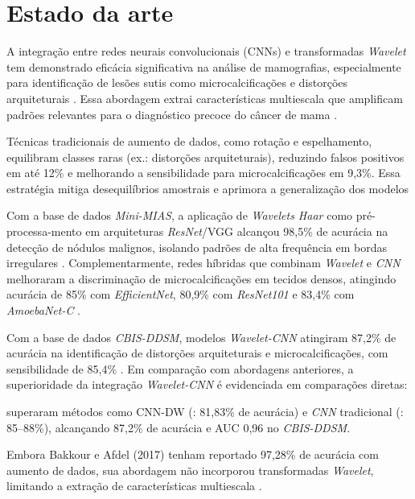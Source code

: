 \chapter{Estado da arte}\label{cap:revisao}

A integração entre redes neurais convolucionais (CNNs) e transformadas \textit{Wavelet} tem demonstrado eficácia significativa na análise de mamografias, especialmente para identificação de lesões sutis como microcalcificações e distorções arquiteturais \cite{blahova2025neural,oyelade2022novel}. Essa abordagem extrai características multiescala que amplificam padrões relevantes para o diagnóstico precoce do câncer de mama \cite{oyelade2022novel}.

Técnicas tradicionais de aumento de dados, como rotação e espelhamento, equilibram classes raras (ex.: distorções arquiteturais), reduzindo falsos positivos em até 12\% e melhorando a sensibilidade para microcalcificações em 9,3\%. Essa estratégia mitiga desequilíbrios amostrais e aprimora a generalização dos modelos \cite{blahova2025neural}

Com a base de dados \textit{Mini-MIAS}, a aplicação de \textit{Wavelets Haar} como pré-processa-mento em arquiteturas \textit{ResNet}/VGG alcançou 98,5\% de acurácia na detecção de nódulos malignos, isolando padrões de alta frequência em bordas irregulares \cite{rasheed2021use}. Complementarmente, redes híbridas que combinam \textit{Wavelet} e \textit{CNN} melhoraram a discriminação de microcalcificações em tecidos densos, atingindo acurácia de 85\% com \textit{EfficientNet}, 80,9\% com \textit{ResNet101} e 83,4\% com \textit{AmoebaNet-C} \cite{banerjee2024introductory}.

Com a base de dados \textit{CBIS-DDSM}, modelos \textit{Wavelet-CNN} atingiram 87,2\% de acurácia na identificação de distorções arquiteturais e microcalcificações, com sensibilidade de 85,4\% \cite{oyelade2022novel}. Em comparação com abordagens anteriores, a superioridade da integração \textit{Wavelet-CNN} é evidenciada em comparações diretas:

\textcite{oyelade2022novel} superaram métodos como CNN-DW (\textcite{jadoon2017three}: 81,83\% de acurácia) e \textit{CNN} tradicional (\textcite{teare2017malignancy}: 85–88\%), alcançando 87,2\% de acurácia e AUC 0,96 no \textit{CBIS-DDSM}.

Embora Bakkour e Afdel (2017) tenham reportado 97,28\% de acurácia com aumento de dados, sua abordagem não incorporou transformadas \textit{Wavelet}, limitando a extração de características multiescala \cite{oyelade2022novel}.

